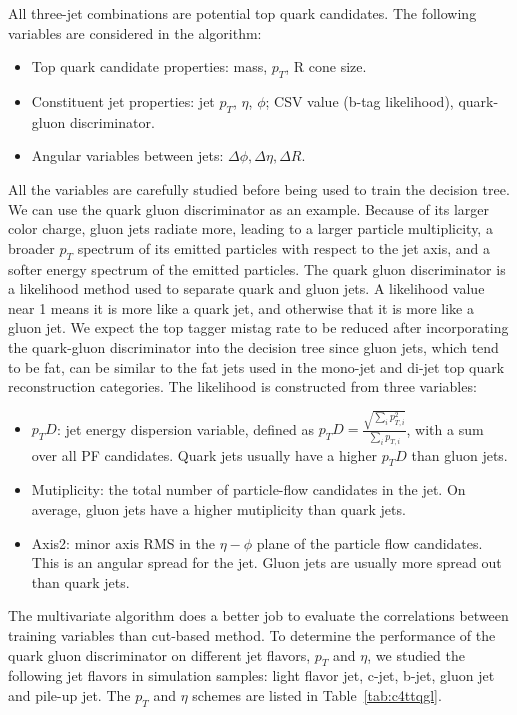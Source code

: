 All three-jet combinations are potential top quark candidates. The following variables are considered in the algorithm: 
\begin{itemize}
\item Top quark candidate properties: mass, $p_{T}$, R cone size.
\item Constituent jet properties: jet $p_{T}$, $\eta$, $\phi$; CSV value (b-tag likelihood), quark-gluon discriminator.
\item Angular variables between jets: $\Delta \phi, \Delta \eta, \Delta R$.
\end{itemize}

All the variables are carefully studied before being used to train the decision tree. We can use the quark gluon discriminator as an example. Because of its larger color charge, gluon jets radiate more, leading to a larger particle multiplicity, a broader $p_{T}$ spectrum of its emitted particles with respect to the jet axis, and a softer energy spectrum of the emitted particles. The quark gluon discriminator is a likelihood method used to separate quark and gluon jets. A likelihood value near 1 means it is more like a quark jet, and otherwise that it is more like a gluon jet. We expect the top tagger mistag rate to be reduced after incorporating the quark-gluon discriminator into the decision tree since gluon jets, which tend to be fat, can be similar to the fat jets used in the mono-jet and di-jet top quark reconstruction categories. The likelihood is constructed from three variables: 
\begin{itemize}
\item $p_{T}D$: jet energy dispersion variable, defined as $p_{T}D=\frac{\sqrt{\sum_{i}p_{T,i}^{2}}}{\sum_{i}p_{T,i}}$, with a sum over all PF candidates. Quark jets usually have a higher $p_{T}D$ than gluon jets.
\item Mutiplicity: the total number of particle-flow candidates in the jet. On average, gluon jets have a higher mutiplicity than quark jets.
\item Axis2: minor axis RMS in the $\eta - \phi$ plane of the particle flow candidates. This is an angular spread for the jet. Gluon jets are usually more spread out than quark jets.
\end{itemize}

The multivariate algorithm does a better job to evaluate the correlations between training variables than cut-based method. To determine the performance of the quark gluon discriminator on different jet flavors, $p_{T}$ and $\eta$, we studied the following jet flavors in \ttbar simulation samples: light flavor jet, c-jet, b-jet, gluon jet and pile-up jet. The $p_{T}$ and $\eta$ schemes are listed in Table~\ref{tab:c4ttqgl}.

